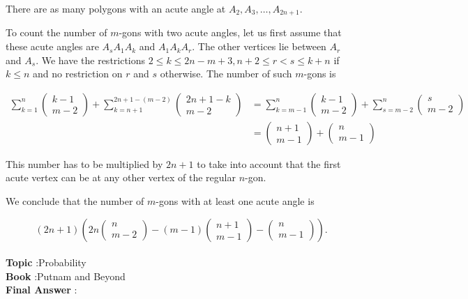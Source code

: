 \documentclass[10pt]{article}
\begin{document}
There are as many polygons with an acute angle at $A_{2}, A_{3}, \ldots, A_{2 n+1}$.

To count the number of $m$-gons with two acute angles, let us first assume that these acute angles are $A_{s} A_{1} A_{k}$ and $A_{1} A_{k} A_{r}$. The other vertices lie between $A_{r}$ and $A_{s}$. We have the restrictions $2 \leq k \leq 2 n-m+3, n+2 \leq r<s \leq k+n$ if $k \leq n$ and no restriction on $r$ and $s$ otherwise. The number of such $m$-gons is

$$
\begin{aligned}
\sum_{k=1}^{n}\left(\begin{array}{c}
k-1 \\
m-2
\end{array}\right)+\sum_{k=n+1}^{2 n+1-(m-2)}\left(\begin{array}{c}
2 n+1-k \\
m-2
\end{array}\right) &=\sum_{k=m-1}^{n}\left(\begin{array}{c}
k-1 \\
m-2
\end{array}\right)+\sum_{s=m-2}^{n}\left(\begin{array}{c}
s \\
m-2
\end{array}\right) \\
&=\left(\begin{array}{c}
n+1 \\
m-1
\end{array}\right)+\left(\begin{array}{c}
n \\
m-1
\end{array}\right)
\end{aligned}
$$

This number has to be multiplied by $2 n+1$ to take into account that the first acute vertex can be at any other vertex of the regular $n$-gon.

We conclude that the number of $m$-gons with at least one acute angle is

$$
(2 n+1)\left(2 n\left(\begin{array}{c}
n \\
m-2
\end{array}\right)-(m-1)\left(\begin{array}{c}
n+1 \\
m-1
\end{array}\right)-\left(\begin{array}{c}
n \\
m-1
\end{array}\right)\right) .
$$
\\
\textbf{Topic} :Probability\\
\textbf{Book} :Putnam and Beyond\\
\textbf{Final Answer} :\\
\end{document}
